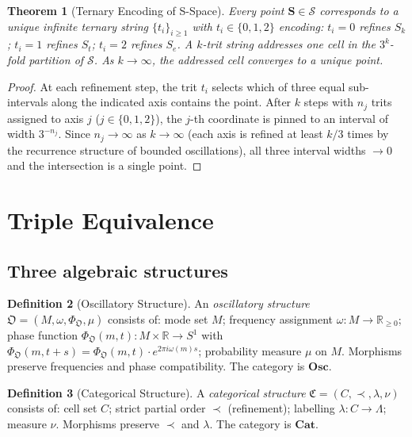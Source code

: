 \documentclass[twocolumn,10pt,a4paper]{article}
\theoremstyle{thmstyle}
\newtheorem{theorem}{Theorem}[section]
\theoremstyle{definition}
\newtheorem{definition}[theorem]{Definition}
\theoremstyle{remark}
\newcommand{\R}{\mathbb{R}}
\newcommand{\Sk}{S_{k}}
\newcommand{\St}{S_{t}}
\newcommand{\Se}{S_{e}}
\newcommand{\Svec}{\mathbf{S}}
\newcommand{\Sspace}{\mathcal{S}}
\newcommand{\Osc}{\mathbf{Osc}}
\newcommand{\Cat}{\mathbf{Cat}}
\begin{document}
\begin{theorem}[Ternary Encoding of S-Space]
\label{thm:ternary_encoding}
Every point $\Svec \in \Sspace$ corresponds to a unique infinite ternary
string $\{t_i\}_{i \geq 1}$ with $t_i \in \{0,1,2\}$ encoding:
$t_i = 0$ refines $\Sk$; $t_i = 1$ refines $\St$; $t_i = 2$ refines $\Se$.
A $k$-trit string addresses one cell in the $3^k$-fold partition of $\Sspace$.
As $k \to \infty$, the addressed cell converges to a unique point.
\end{theorem}

\begin{proof}
At each refinement step, the trit $t_i$ selects which of three equal
sub-intervals along the indicated axis contains the point.
After $k$ steps with $n_j$ trits assigned to axis $j$ ($j \in \{0,1,2\}$),
the $j$-th coordinate is pinned to an interval of width $3^{-n_j}$.
Since $n_j \to \infty$ as $k \to \infty$ (each axis is refined at least
$k/3$ times by the recurrence structure of bounded oscillations),
all three interval widths $\to 0$ and the intersection is a single point.
\end{proof}

\section{Triple Equivalence}
\label{sec:triple}

\subsection{Three algebraic structures}

\begin{definition}[Oscillatory Structure]
An \emph{oscillatory structure} $\mathfrak{O} = (M, \omega, \Phi_\mathfrak{O}, \mu)$
consists of: mode set $M$; frequency assignment $\omega : M \to \R_{\geq 0}$;
phase function $\Phi_\mathfrak{O}(m,t) : M \times \R \to S^1$ with
$\Phi_\mathfrak{O}(m, t+s) = \Phi_\mathfrak{O}(m,t) \cdot e^{2\pi i \omega(m) s}$;
probability measure $\mu$ on $M$.
Morphisms preserve frequencies and phase compatibility.
The category is $\Osc$.
\end{definition}

\begin{definition}[Categorical Structure]
A \emph{categorical structure} $\mathfrak{C} = (C, \prec, \lambda, \nu)$
consists of: cell set $C$; strict partial order $\prec$ (refinement);
labelling $\lambda : C \to \Lambda$; measure $\nu$.
Morphisms preserve $\prec$ and $\lambda$. The category is $\Cat$.
\end{definition}
\end{document}
